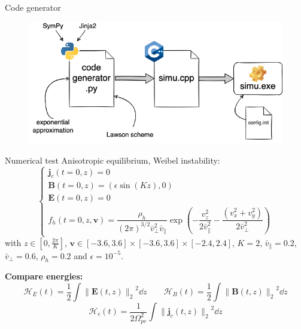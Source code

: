 \documentclass{beamer}
\newcommand{\mbold}[1]{{\textbf{\color{PLB}#1}}}
\newcommand{\Mvb}[1]{\boldsymbol{#1}}
\begin{document}
\begin{frame}{Code generator}
  
  \begin{figure}
    \includegraphics[width=\textwidth]{img/codegen}
  \end{figure}
\end{frame}

\begin{frame}{Numerical test}
  Anisotropic equilibrium, Weibel instability:
  $$
    \begin{cases}
      \Mvb{j}_c(t=0,z) = 0 \\
      \Mvb{B}(t=0,z) = \left( \epsilon \sin(Kz) , 0 \right) \\
      \Mvb{E}(t=0,z) = 0 \\
      f_h(t=0,z,\Mvb{v}) = \dfrac{\rho_h}{ (2\pi)^{3/2} \bar{v}_\perp^2 \bar{v}_\parallel }\exp( -\dfrac{v_z^2}{2\bar{v}_\parallel^2} - \dfrac{(v_x^2 + v_y^2)}{2\bar{v}_\perp^2}  )
    \end{cases}
  $$
  with $z\in[0,\frac{2\pi}{K}]$, $\Mvb{v}\in[-3.6,3.6]\times[-3.6,3.6]\times[-2.4,2.4]$, $K=2$, $\bar{v}_\parallel=0.2$, $\bar{v}_\perp = 0.6$, $\rho_h=0.2$ and $\epsilon=10^{-5}$.

  \mbold{Compare energies:}
  $$
    \mathcal{H}_E(t) = \frac{1}{2}\int {\| \Mvb{E}(t,z) \|_2}^2\dd{z}
    \qquad
    \mathcal{H}_B(t) = \frac{1}{2}\int {\| \Mvb{B}(t,z) \|_2}^2\dd{z}
  $$
  $$
    \mathcal{H}_c(t) = \frac{1}{2\Omega_{pe}^2}\int {\| \Mvb{j}_c(t,z) \|_2}^2\dd{z}
  $$
\end{frame}
\end{document}
